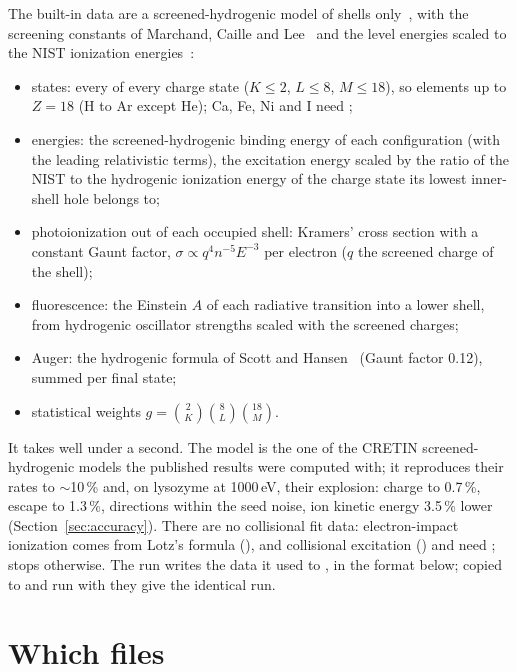 The built-in data are a screened-hydrogenic model of shells only~\cite{scott2010}, with the screening constants of
Marchand, Caille and Lee~\cite{marchand1990} and the level energies scaled to the NIST ionization
energies~\cite{nist}:
\begin{itemize}
  \item states: every  of every charge state ($K \le 2$, $L \le 8$, $M \le 18$), so elements up to
    $Z = 18$ (H to Ar except He); Ca, Fe, Ni and I need ;
  \item energies: the screened-hydrogenic binding energy of each configuration (with the leading relativistic
    terms), the excitation energy scaled by the ratio of the NIST to the hydrogenic ionization energy of the charge
    state its lowest inner-shell hole belongs to;
  \item photoionization out of each occupied shell: Kramers' cross section with a constant Gaunt factor,
    $\sigma \propto q^4 n^{-5} E^{-3}$ per electron ($q$ the screened charge of the shell);
  \item fluorescence: the Einstein $A$ of each radiative transition into a lower shell, from hydrogenic oscillator
    strengths scaled with the screened charges;
  \item Auger: the hydrogenic formula of Scott and Hansen~\cite{scott2010} (Gaunt factor 0.12), summed per final state;
  \item statistical weights $g = \binom{2}{K}\binom{8}{L}\binom{18}{M}$.
\end{itemize}
It takes well under a second.
The model is the one of the CRETIN screened-hydrogenic models the published results were computed with; it reproduces
their rates to $\sim$10\,\% and, on lysozyme at 1000\,eV, their explosion: charge to 0.7\,\%, escape to 1.3\,\%,
directions within the seed noise, ion kinetic energy 3.5\,\% lower (Section~\ref{sec:accuracy}).
There are no collisional fit data: electron-impact ionization comes from Lotz's formula (),
and collisional excitation () and  need
;  stops otherwise.
The run writes the data it used to , in the format below; copied to
 and run with  they give the identical run.

\section{Which files}

